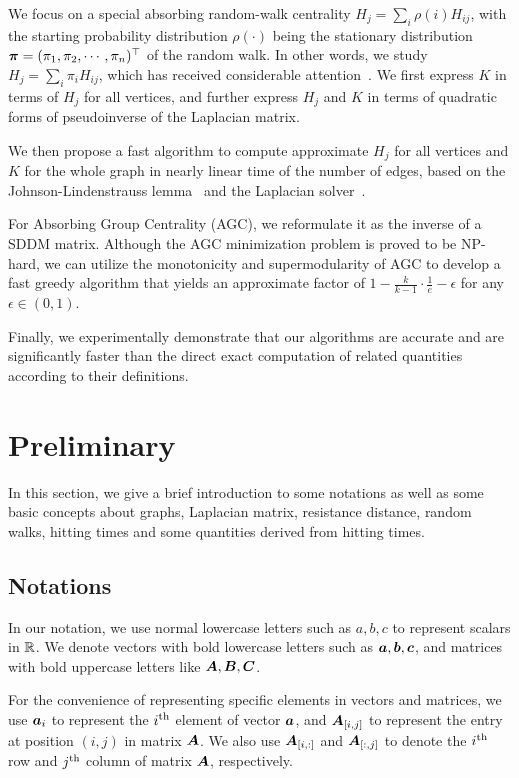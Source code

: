 \documentclass[journal]{IEEEtran}
\begin{document}
We focus on a special absorbing random-walk centrality \(H_j=\sum_{i} \rho(i) H_{ij}\), with the starting probability distribution \(\rho(\cdot)\) being the stationary distribution \(\boldsymbol{\pi}=(\pi_1, \pi_2, \cdots, \pi_n)^{\top}\) of the random walk.
In other words,  we study \(H_j=\sum_{i} \pi_i H_{ij}\), which has received considerable attention~\cite{TeBeVo09,Be09,Be16}.
We first express \(K\) in terms of \(H_j\) for all vertices, and further express \(H_j\) and \(K\) in terms of quadratic forms of pseudoinverse of the Laplacian matrix.

We then propose a fast algorithm to compute approximate \(H_j\) for all vertices and \(K\) for the whole graph in nearly linear time of the number of edges, based on the Johnson-Lindenstrauss lemma~\cite{Ac01} and the Laplacian solver~\cite{SpTe04,Sp10,KoMiPe11,LiBr12,CoKyMiPaPeRaSu14,KySa16,GaKySp23}.

For Absorbing Group Centrality (AGC), we reformulate it as the inverse of a SDDM matrix.
Although the AGC minimization problem is proved to be NP-hard, we can utilize the monotonicity and supermodularity of AGC to develop a fast greedy algorithm that yields an approximate factor of \(1-\frac{k}{k-1}\cdot\frac{1}{e}-\epsilon\) for any \(\epsilon\in(0,1)\).

Finally, we experimentally demonstrate that our algorithms are accurate and are significantly faster than the direct exact computation of related quantities according to their definitions.

\section{Preliminary}

In this section, we give a brief introduction to some notations as well as some basic concepts about graphs, Laplacian matrix, resistance distance, random walks, hitting times and some quantities derived from hitting times.

\subsection{Notations}

In our notation, we use normal lowercase letters such as \(a,b,c\) to represent scalars in \(\mathbb{R}\). We denote vectors with bold lowercase letters such as \(\boldsymbol{a},\boldsymbol{b},\boldsymbol{c}\), and matrices with bold uppercase letters like \(\boldsymbol{A},\boldsymbol{B},\boldsymbol{C}\).

For the convenience of representing specific elements in vectors and matrices, we use \(\boldsymbol{a}_{i}\) to represent the \({i}^{\rm{th}}\) element of vector \(\boldsymbol{a}\), and \(\boldsymbol{A}_{[i,j]}\) to represent the entry at position \((i,j)\) in matrix \(\boldsymbol{A}\).
We also use \(\boldsymbol{A}_{[i,:]}\) and \(\boldsymbol{A}_{[:,j]}\) to denote the \({i}^{\rm{th}}\) row and \({j}^{\rm{th}}\) column of matrix \(\boldsymbol{A}\), respectively.
\end{document}
